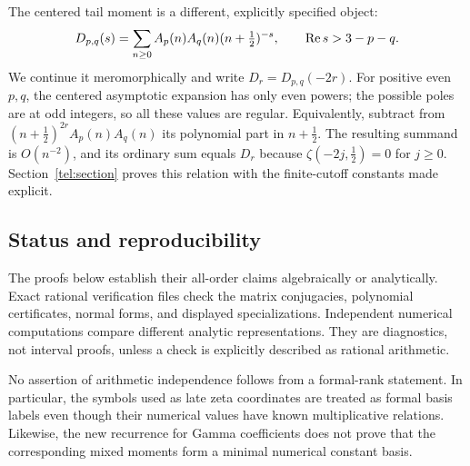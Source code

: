 The centered tail moment is a different, explicitly specified object:
\begin{equation}\label{scope:centered}
 D_{p,q}(s)=\sum_{n\ge0}
       A_p(n)A_q(n)(n+\tfrac12)^{-s},
 \qquad \operatorname{Re} s>3-p-q.
\end{equation}
We continue it meromorphically and write
$D_r=D_{p,q}(-2r)$. For positive even $p,q$, the centered asymptotic
expansion has only even powers; the possible poles are at odd
integers, so all these values are regular. Equivalently, subtract
from $(n+\tfrac12)^{2r}A_p(n)A_q(n)$ its polynomial part in
$n+\tfrac12$. The resulting summand is $O(n^{-2})$, and its ordinary
sum equals $D_r$ because
$\zeta(-2j,\tfrac12)=0$ for $j\ge0$. Section~\ref{tel:section}
proves this relation with the finite-cutoff constants made explicit.

\subsection{Status and reproducibility}

The proofs below establish their all-order claims algebraically or
analytically. Exact rational verification files check the matrix
conjugacies, polynomial certificates, normal forms, and displayed
specializations. Independent numerical computations compare different
analytic representations. They are diagnostics, not interval proofs,
unless a check is explicitly described as rational arithmetic.

No assertion of arithmetic independence follows from a formal-rank
statement. In particular, the symbols used as late zeta coordinates
are treated as formal basis labels even though their numerical values
have known multiplicative relations. Likewise, the new recurrence for
Gamma coefficients does not prove that the corresponding mixed moments
form a minimal numerical constant basis.
